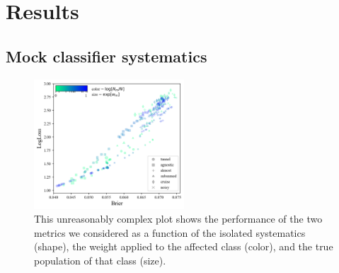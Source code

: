 \section{Results}
\label{sec:results}

\subsection{Mock classifier systematics}
\label{sec:mockresults}

\begin{figure}
	\begin{center}
		\includegraphics[width=0.5\textwidth]{./fig/all_effects_isolated.png}
		\caption{This unreasonably complex plot shows the performance of the two metrics we considered as a function of the isolated systematics (shape), the weight applied to the affected class (color), and the true population of that class (size).}
		\label{fig:plasticc_all}
	\end{center}
\end{figure}

%


